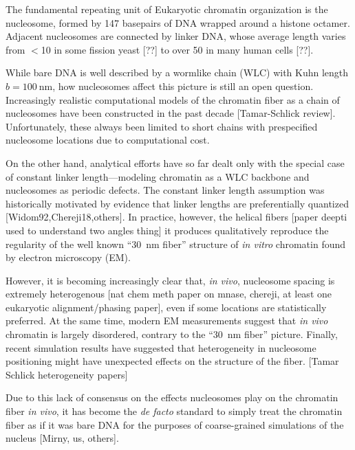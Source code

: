 \documentclass[%
 reprint,
superscriptaddress,
showpacs,preprintnumbers,
 amsmath,amssymb,
 aps,
 prl,
]{revtex4-1}
\begin{document}
The fundamental repeating unit of Eukaryotic chromatin organization is the
    nucleosome, formed by 147 basepairs of DNA wrapped around a histone octamer.
Adjacent nucleosomes are connected by linker DNA, whose average length varies from
    $<$\SI{10}{\basepair} in some fission yeast [??] to over \SI{50}{\basepair} in
    many human cells [??].

While bare DNA is well described by a wormlike chain (WLC) with Kuhn length
    {$b = \SI{100}{\nano\metre}$}, how nucleosomes affect this picture is still an
    open question.
Increasingly realistic computational models of the chromatin fiber as a chain
    of nucleosomes have been constructed in the past decade [Tamar-Schlick review].
Unfortunately, these always been limited to short chains with prespecified nucleosome
    locations due to computational cost.

On the other hand, analytical efforts have so far dealt only with the special
    case of constant linker length---modeling chromatin as a WLC backbone and
    nucleosomes as periodic defects.
The constant linker length assumption was historically motivated by evidence
    that linker lengths are preferentially quantized [Widom92,Chereji18,others].
In practice, however, the helical fibers [paper deepti used to understand
    two angles thing] it produces qualitatively reproduce the regularity of the
    well known ``\SI{30}{\nano\metre} fiber'' structure of \textit{in vitro}
    chromatin found by electron microscopy (EM).

However, it is becoming increasingly clear that, \textit{in vivo}, nucleosome
    spacing is extremely heterogenous [nat chem meth paper on mnase, chereji, at
    least one eukaryotic alignment/phasing paper], even if some locations are
    statistically preferred.
At the same time, modern EM measurements suggest that \textit{in vivo} chromatin
    is largely disordered, contrary to the ``\SI{30}{\nano\metre} fiber''
    picture.
Finally, recent simulation results have suggested that heterogeneity in
    nucleosome positioning might have unexpected effects on the structure of the
    fiber. [Tamar Schlick heterogeneity papers]

Due to this lack of consensus on the effects nucleosomes play on the
    chromatin fiber \textit{in vivo}, it has become the \textit{de facto}
    standard to simply treat the chromatin fiber as if it was bare DNA for
    the purposes of coarse-grained simulations of the nucleus [Mirny, us,
    others].
\end{document}
